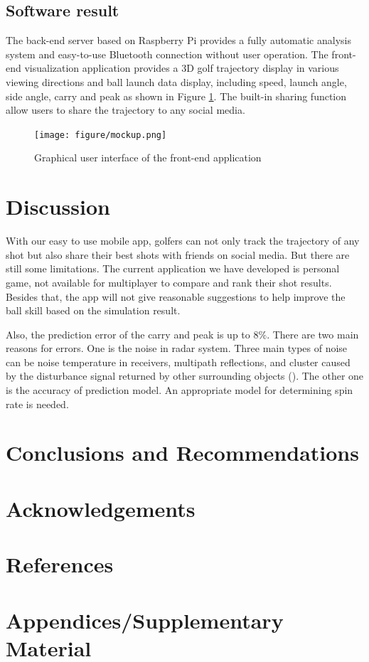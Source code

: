 \subsection{Software result}
The back-end server based on Raspberry Pi provides a fully automatic analysis system and easy-to-use Bluetooth connection without user operation. The front-end visualization application provides a 3D golf trajectory display in various viewing directions and ball launch data display, including speed, launch angle, side angle, carry and peak as shown in Figure \ref{fig:mockup}. The built-in sharing function allow users to share the trajectory to any social media. 
\begin{figure}[H]
    \centering
    \texttt{[image: figure/mockup.png]}
    \caption{Graphical user interface of the front-end application}
     \label{fig:mockup}
\end{figure}

\section{Discussion}
With our easy to use mobile app, golfers can not only track the trajectory of any shot but also share their best shots with friends on social media. But there are still some limitations. The current application we have developed is personal game, not available for multiplayer to compare and rank their shot results. Besides that, the app will not give reasonable suggestions to help improve the ball skill based on the simulation result. 

Also, the prediction error of the carry and peak is up to 8$\%$. There are two main reasons for errors. One is the noise in radar system. Three main types of noise can be noise temperature in receivers, multipath reflections, and cluster caused by the disturbance signal returned by other surrounding objects (\cite{martin2012evaluation}). The other one is the accuracy of prediction model. An appropriate model for determining spin rate is needed.


\section{Conclusions and Recommendations}


\section{Acknowledgements }

\newpage
\section{References}
\printbibliography[heading=none]


\section{Appendices/Supplementary Material}


